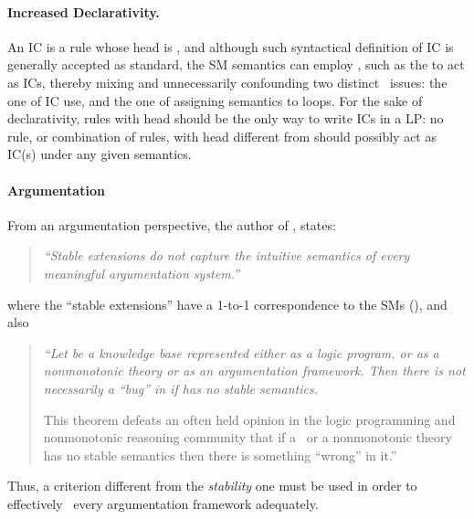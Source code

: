 \documentclass{llncs}
\begin{document}
		\paragraph{{\bf Increased Declarativity.}}\label{subsec:increasedDeclarativity}
			An IC is a rule whose head is , and although such syntactical definition of IC is generally accepted as standard, the
			SM semantics can employ \olons, such as the  to act as ICs, thereby mixing and unnecessarily confounding two distinct
			\KR\ issues: the one of IC use, and the one of assigning semantics to loops.
			For the sake of declarativity, rules with  head should be the only way to write ICs in a LP: no rule, 
			or combination of rules, with head different from  should possibly act as IC(s) under any given semantics.
		\paragraph{{\bf Argumentation}}\label{subsec:modelingArgumentation}
			From an argumentation perspective, the author of \cite{dung95acceptability}, states:
			\begin{quotation}
				{\em ``Stable extensions do not capture the intuitive semantics of every meaningful argumentation system.''}
			\end{quotation}
			where the ``stable extensions'' have a 1-to-1 correspondence to the SMs (\cite{dung95acceptability}), and also
			\begin{quotation}
				{\em ``Let  be a knowledge base represented either as a logic program, or as a nonmonotonic theory or as an argumentation 
						framework. 
						Then there is not necessarily a ``bug'' in  if  has no stable semantics.
						
						This theorem defeats an often held opinion in the logic programming and nonmonotonic reasoning community that if a \lp\ 
						or a nonmonotonic theory has no stable semantics then there is something ``wrong'' in it.''}
			\end{quotation}
			Thus, a criterion different from the \emph{stability} one must be used in order to effectively \m\ every argumentation framework adequately.
\end{document}
